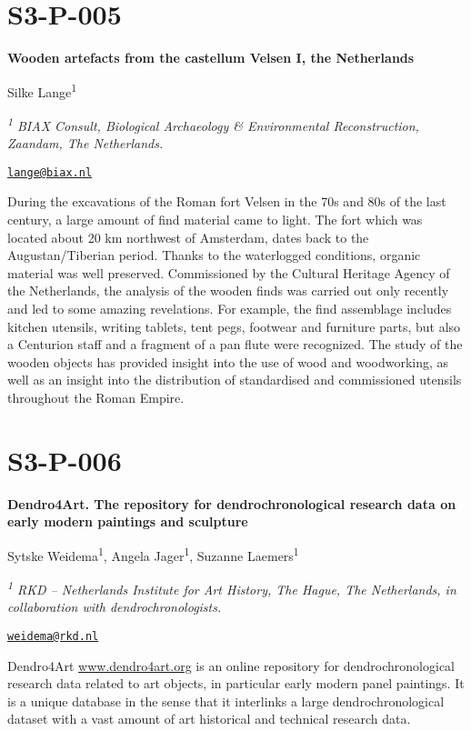 \documentclass[
]{book}
\begin{document}
\hypertarget{s3-p-005}{%
\section*{S3-P-005}\label{s3-p-005}}

\textbf{Wooden artefacts from the castellum Velsen I, the Netherlands}

Silke Lange\textsuperscript{1}

\emph{\textsuperscript{1} BIAX Consult, Biological Archaeology \& Environmental Reconstruction, Zaandam, The Netherlands.}

\href{mailto:lange@biax.nl}{\nolinkurl{lange@biax.nl}}

During the excavations of the Roman fort Velsen in the 70s and 80s of the last century, a large amount of find material came to light. The fort which was located about 20 km northwest of Amsterdam, dates back to the Augustan/Tiberian period. Thanks to the waterlogged conditions, organic material was well preserved. Commissioned by the Cultural Heritage Agency of the Netherlands, the analysis of the wooden finds was carried out only recently and led to some amazing revelations. For example, the find assemblage includes kitchen utensils, writing tablets, tent pegs, footwear and furniture parts, but also a Centurion staff and a fragment of a pan flute were recognized. The study of the wooden objects has provided insight into the use of wood and woodworking, as well as an insight into the distribution of standardised and commissioned utensils throughout the Roman Empire.

\hypertarget{s3-p-006}{%
\section*{S3-P-006}\label{s3-p-006}}

\textbf{Dendro4Art. The repository for dendrochronological research data on early modern paintings and sculpture}

Sytske Weidema\textsuperscript{1}, Angela Jager\textsuperscript{1}, Suzanne Laemers\textsuperscript{1}

\emph{\textsuperscript{1} RKD -- Netherlands Institute for Art History, The Hague, The Netherlands, in collaboration with dendrochronologists.}

\href{mailto:weidema@rkd.nl}{\nolinkurl{weidema@rkd.nl}}

Dendro4Art \href{http://www.dendro4art.org}{www.dendro4art.org} is an online repository for dendrochronological research data related to art objects, in particular early modern panel paintings. It is a unique database in the sense that it interlinks a large dendrochronological dataset with a vast amount of art historical and technical research data.
\end{document}
